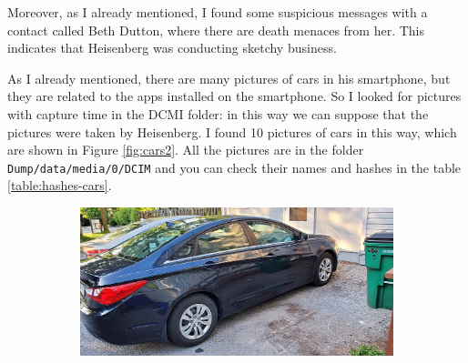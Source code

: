 \documentclass[12pt]{article}
\begin{document}
Moreover, as I already mentioned, I found some suspicious messages with a contact called Beth Dutton, where there are death menaces from her. This indicates that Heisenberg was conducting sketchy business.

As I already mentioned, there are many pictures of cars in his smartphone, but they are related to the apps installed on the smartphone. So I looked for pictures with capture time in the DCMI folder: in this way we can suppose that the pictures were taken by Heisenberg. I found 10 pictures of cars in this way, which are shown in Figure \ref{fig:cars2}. All the pictures are in the folder \texttt{Dump/data/media/0/DCIM} and you can check their names and hashes in the table \ref{table:hashes-cars}.

\begin{figure}[!ht]
    \centering
    \begin{subfigure}[b]{0.4\textwidth}
        \centering
        \includegraphics[width=\textwidth]{images/car_photos/20210703_192737.jpg} %
        \caption{}
    \end{subfigure}
    \hspace{2 pt}
    \begin{subfigure}[b]{0.4\textwidth}
        \centering

\end{subfigure}
\end{figure}
\end{document}

